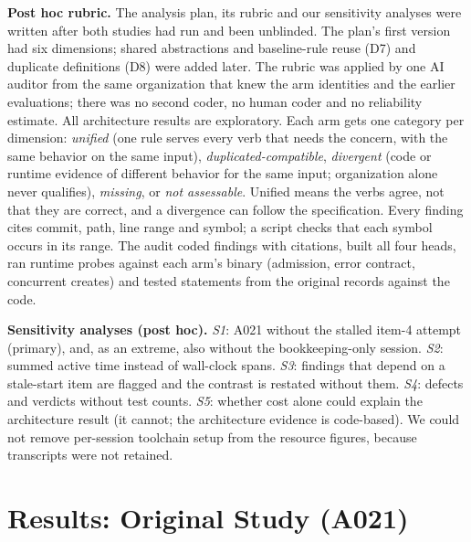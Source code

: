 \documentclass[10pt,conference]{IEEEtran}
\begin{document}
\textbf{Post hoc rubric.} The analysis plan, its rubric and our sensitivity analyses were written after both studies had run and been unblinded. The plan's first version had six dimensions; shared abstractions and baseline-rule reuse (D7) and duplicate definitions (D8) were added later. The rubric was applied by one AI auditor from the same organization that knew the arm identities and the earlier evaluations; there was no second coder, no human coder and no reliability estimate. All architecture results are exploratory. %
Each arm gets one category per dimension: \emph{unified} (one rule serves every verb that needs the concern, with the same behavior on the same input), \emph{duplicated-compatible}, \emph{divergent} (code or runtime evidence of different behavior for the same input; organization alone never qualifies), \emph{missing}, or \emph{not assessable}. Unified means the verbs agree, not that they are correct, and a divergence can follow the specification. Every finding cites commit, path, line range and symbol; a script checks that each symbol occurs in its range. The audit coded \ArchFindings{} findings with \ArchCitations{} citations, built all four heads, ran runtime probes against each arm's binary (admission, error contract, concurrent creates) and tested \ArchFalsificationAttempts{} statements from the original records against the code. %

\textbf{Sensitivity analyses (post hoc).} \emph{S1}: A021 without the stalled item-4 attempt (primary), and, as an extreme, also without the bookkeeping-only session. \emph{S2}: summed active time instead of wall-clock spans. \emph{S3}: findings that depend on a stale-start item are flagged and the contrast is restated without them. \emph{S4}: defects and verdicts without test counts. \emph{S5}: whether cost alone could explain the architecture result (it cannot; the architecture evidence is code-based). We could not remove per-session toolchain setup from the resource figures, because transcripts were not retained.

\section{Results: Original Study (A021)}\label{sec:results}


\end{document}
